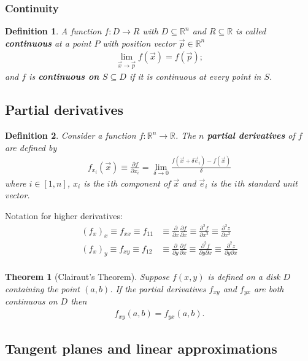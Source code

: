 \documentclass{article}
\theoremstyle{sltheorem}
\newtheorem{definition}{Definition}[section]
\newtheorem{theorem}{Theorem}[section]
\newcommand{\R}{\mathbb{R}}
\newcommand{\p}{\partial}
\newcommand*\B[1]{\textbf{#1}}
\begin{document}
\subsubsection{Continuity}
\begin{definition}
    A function $f:D\to R$ with $D\subseteq\R^n$ and $R\subseteq\R$
    is called \B{continuous} at a point $P$ with position vector $\vec p\in \R^n$
    \begin{align*}
        \lim_{\vec x\to \vec p}f(\vec x) = f(\vec p);
    \end{align*}
    and $f$ is \B{continuous on $S\subseteq D$} if it is continuous at 
    every point in $S$.
\end{definition}
\subsection{Partial derivatives}
\begin{definition}
    Consider a function $f:\R^n\to\R$. The $n$ \B{partial derivatives} of
    $f$ are defined by
    \begin{align*}
        f_{x_i}(\vec x)\equiv\frac{\p f}{\p x_i}=\lim_{\delta\to 0}\frac{f(\vec x + \delta \vec e_i)-f(\vec x)}{\delta}
    \end{align*}
    where $i\in[1,n]$, $x_i$ is the $i$th component of $\vec x$ and $\vec e_i$ is the
    $i$th standard unit vector.
\end{definition}
Notation for higher derivatives:
\begin{align*}
    (f_x)_x \equiv f_{xx} \equiv f_{11} 
    &\equiv \frac{\p}{\p x}\frac{\p f}{\p x} 
    \equiv \frac{\p^2 f}{\p x^2}
    \equiv \frac{\p^2 z}{\p x^2}\\
    (f_x)_y \equiv f_{xy} \equiv f_{12} 
    &\equiv \frac{\p}{\p y}\frac{\p f}{\p x} 
    \equiv \frac{\p^2 f}{\p y \p x}
    \equiv \frac{\p^2 z}{\p y \p x}\\
\end{align*}
\begin{theorem}[Clairaut's Theorem]
    Suppose $f(x,y)$ is defined on a disk $D$ containing the point $(a,b)$.
    If the partial derivatives $f_{xy}$ and $f_{yx}$ are both continuous
    on $D$ then
    \begin{align*}
        f_{xy}(a,b)=f_{yx}(a,b).
    \end{align*}
\end{theorem}
\subsection{Tangent planes and linear approximations}
\end{document}
